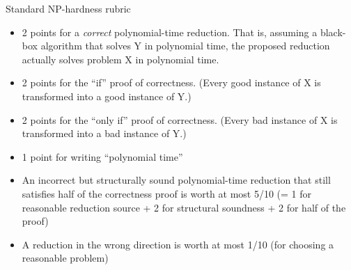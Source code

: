 \documentclass[11pt]{article}
\begin{document}
\begin{Rubric}{Standard NP-hardness rubric}
\begin{itemize}
\item[+] 2 points for a \emph{correct} polynomial-time reduction.  That is, assuming a black-box algorithm that solves Y in polynomial time, the proposed reduction actually solves problem X in polynomial time.
\item[+] 2 points for the “if” proof of correctness.  (Every good instance of X is transformed into a good instance of Y.)
\item[+] 2 points for the “only if” proof of correctness.  (Every bad instance of X is transformed into a bad instance of Y.)
\item[+] 1 point for writing “polynomial time”
\medskip
\item
An incorrect but structurally sound polynomial-time reduction that still satisfies half of the correctness proof is worth at most 5/10 (= 1 for reasonable reduction source + 2 for structural soundness + 2 for half of the proof)
\item
A reduction in the wrong direction is worth at most 1/10 (for choosing a reasonable problem)
\end{itemize}
\end{Rubric}
\end{document}
